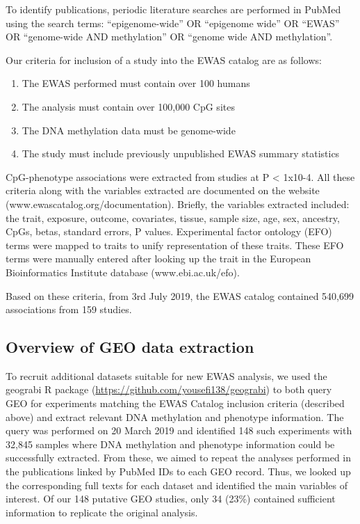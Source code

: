 \documentclass[11pt,twoside]{bristolthesis}
\providecommand{\tightlist}{%
  \setlength{\itemsep}{0pt}\setlength{\parskip}{0pt}}
\begin{document}
To identify publications, periodic literature searches are performed in PubMed using the search terms: ``epigenome-wide'' OR ``epigenome wide'' OR ``EWAS'' OR ``genome-wide AND methylation'' OR ``genome wide AND methylation''.

Our criteria for inclusion of a study into the EWAS catalog are as follows:
\begin{enumerate}
\def\labelenumi{\arabic{enumi}.}
\tightlist
\item
  The EWAS performed must contain over 100 humans
\item
  The analysis must contain over 100,000 CpG sites
\item
  The DNA methylation data must be genome-wide
\item
  The study must include previously unpublished EWAS summary statistics
\end{enumerate}
CpG-phenotype associations were extracted from studies at P \textless{} 1x10-4. All these criteria along with the variables extracted are documented on the website (www.ewascatalog.org/documentation). Briefly, the variables extracted included: the trait, exposure, outcome, covariates, tissue, sample size, age, sex, ancestry, CpGs, betas, standard errors, P values. Experimental factor ontology (EFO) terms were mapped to traits to unify representation of these traits. These EFO terms were manually entered after looking up the trait in the European Bioinformatics Institute database (www.ebi.ac.uk/efo).

Based on these criteria, from 3rd July 2019, the EWAS catalog contained 540,699 associations from 159 studies.

\hypertarget{overview-of-geo-data-extraction}{%
\subsection{Overview of GEO data extraction}\label{overview-of-geo-data-extraction}}

To recruit additional datasets suitable for new EWAS analysis, we used the geograbi R package (\url{https://github.com/yousefi138/geograbi}) to both query GEO for experiments matching the EWAS Catalog inclusion criteria (described above) and extract relevant DNA methylation and phenotype information. The query was performed on 20 March 2019 and identified 148 such experiments with 32,845 samples where DNA methylation and phenotype information could be successfully extracted. From these, we aimed to repeat the analyses performed in the publications linked by PubMed IDs to each GEO record. Thus, we looked up the corresponding full texts for each dataset and identified the main variables of interest. Of our 148 putative GEO studies, only 34 (23\%) contained sufficient information to replicate the original analysis.
\end{document}
